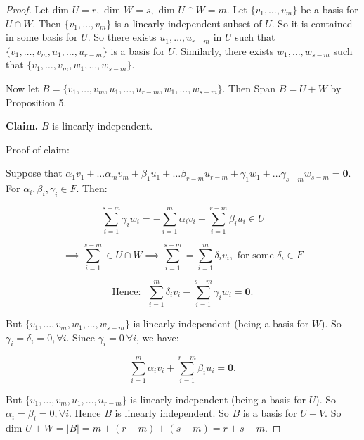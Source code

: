 \documentclass[10pt]{scrartcl}
\begin{document}
\begin{proof}
Let dim $U = r, $ dim $W = s, $ dim $U \cap W = m$. Let $\{v_1, \dots, v_m\}$ be a basis for $U \cap W$. Then $\{v_1,\dots,v_m\}$ is a linearly independent subset of $U$. So it is contained in some basis for $U$. So there exists $u_1,\dots, u_{r-m}$ in $U$ such that $\{v_1,\dots,v_m,u_1,\dots,u_{r-m}\}$ is a basis for $U$. Similarly, there exists $w_1,\dots,w_{s-m}$ such that $\{v_1,\dots,v_m,w_1,\dots,w_{s-m}\}$.

Now let $B = \{v_1,\dots,v_m,u_1,\dots,u_{r-m},w_1,\dots,w_{s-m}\}$. Then Span $B = U + W$ by Proposition 5.

\textbf{Claim.} $B$ is linearly independent.

Proof of claim:

Suppose that $\alpha_1v_1 + \dots \alpha_mv_m + \beta_1u_1 + \dots \beta_{r-m}u_{r-m} + \gamma_1w_1 + \dots \gamma_{s-m}w_{s-m} = \mathbf{0}.$ For $\alpha_i, \beta_i, \gamma_i \in F$. Then:

\[\sum_{i=1}^{s-m} \gamma_iw_i = -\sum_{i = 1}^{m} \alpha_iv_i - \sum_{i=1}^{r-m} \beta_iu_i \in U \]

\[\implies \sum_{i=1}^{s-m} \in U \cap W \implies \sum_{i=1}^{s-m} = \sum_{i=1}^{m} \delta_iv_i, \text{ for some } \delta_i \in F\]

\[\text{Hence:~ }\sum_{i=1}^{m} \delta_iv_i - \sum_{i=1}^{s-m} \gamma_iw_i = \mathbf{0}.\]

But $\{v_1,\dots,v_m,w_1,\dots,w_{s-m}\}$ is linearly independent (being a basis for $W$). So $\gamma_i =\delta_i = 0, \forall i$. Since $\gamma_i = 0 ~\forall i$, we have:

\[\sum_{i=1}^{m} \alpha_iv_i + \sum_{i=1}^{r-m} \beta_iu_i = \mathbf{0}.\]
 
 But $\{v_1,\dots,v_m,u_1,\dots,u_{r-m}\}$ is linearly independent (being a basis for $U$). So $\alpha_i =\beta_i = 0, \forall i$. Hence $B$ is linearly independent. So $B$ is a basis for $U+V$. So dim $U + W = |B| = m + (r-m) + (s-m) = r + s - m$.
\end{proof}\vspace*{10pt}
 
\end{document}
